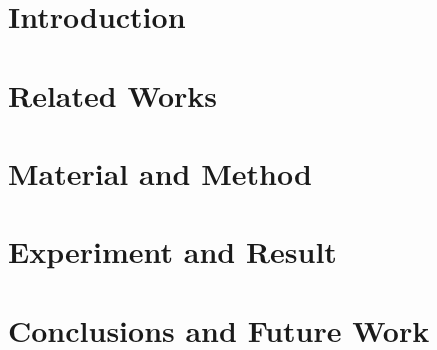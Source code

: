 

\chapter{Introduction} \label{ch:1-introduction}
	

\chapter{Related Works} \label{ch:2-background}
	

\chapter{Material and Method} \label{ch:3-proposed}
	
	
\chapter{Experiment and Result} \label{ch:4-simulation}
	
	
\chapter{Conclusions and Future Work} \label{ch:5-conclusion}
	

